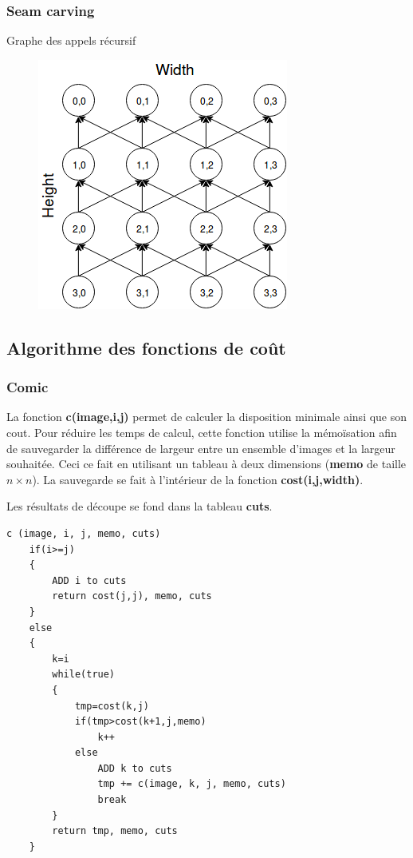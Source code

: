 \documentclass[10pt]{article}
\begin{document}
\subsubsection{Seam carving}
Graphe des appels récursif
 \begin{figure} [h]
      \centering
      \includegraphics[scale=0.5]{GrapheSeamCarving.png}
   \end{figure}
\subsection{Algorithme des fonctions de coût}
\subsubsection{Comic}La fonction \textbf{ c(image,i,j)} permet de calculer la disposition minimale ainsi que son cout. Pour réduire les temps de calcul, cette fonction utilise la mémoïsation afin de sauvegarder la différence de largeur entre un ensemble d'images et la largeur souhaitée. Ceci ce fait en utilisant un tableau à deux dimensions (\textbf{memo} de taille $n \times n$). La sauvegarde se fait à l'intérieur de la fonction \textbf{cost(i,j,width)}.

Les résultats de découpe se fond dans la tableau \textbf{cuts}.
\begin{lstlisting}[frame=single]
c (image, i, j, memo, cuts)
	if(i>=j)
	{
		ADD i to cuts
		return cost(j,j), memo, cuts 
	}
	else
	{
		k=i
		while(true)
		{
			tmp=cost(k,j)
			if(tmp>cost(k+1,j,memo)
				k++
			else
				ADD k to cuts
				tmp += c(image, k, j, memo, cuts)
				break
		}
		return tmp, memo, cuts
	}
\end{lstlisting}
\end{document}
